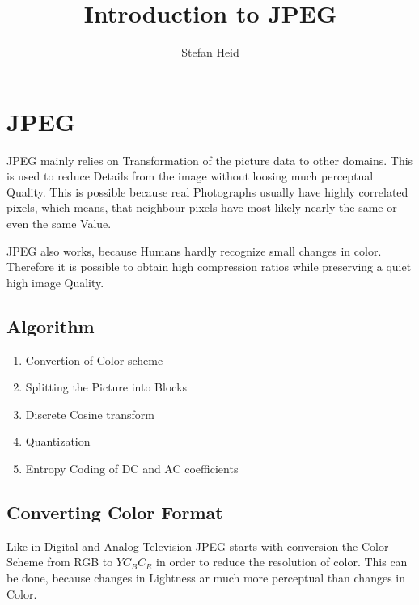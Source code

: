 \documentclass{scrartcl}
\author{Stefan Heid}
\title{Introduction to JPEG}
\begin{document}
\maketitle
\tableofcontents
\newpage

\section{JPEG}
JPEG mainly relies on Transformation of the picture data to other domains. This is used to reduce Details from the image without loosing much perceptual Quality. This is possible because real Photographs usually have highly correlated pixels, which means, that neighbour pixels have most likely nearly the same or even the same Value.

JPEG also works, because Humans hardly recognize small changes in color. Therefore it is possible to obtain high compression ratios while preserving a quiet high image Quality.

\subsection{Algorithm}
\begin{enumerate}
\item Convertion of Color scheme
\item Splitting the Picture into Blocks
\item Discrete Cosine transform
\item Quantization
\item Entropy Coding of DC and AC coefficients
\end{enumerate}

\subsection{Converting Color Format}
Like in Digital and Analog Television JPEG starts with conversion the Color Scheme from RGB to $ YC_BC_R $ in order to reduce the resolution of color. This can be done, because changes in Lightness ar much more perceptual than changes in Color.
\end{document}
